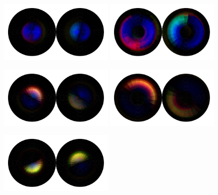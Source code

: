 \begin{figure}[h!]
    \begin{center}
        \includegraphics[width=0.49\textwidth]{figures/appendix_featurevis/TU3_0_1_0.pdf}
        \includegraphics[width=0.49\textwidth]{figures/appendix_featurevis/TU3_0_1_1.pdf}
    \end{center}
    \begin{center}
        \includegraphics[width=0.49\textwidth]{figures/appendix_featurevis/TU3_3_0_0.pdf}
        \includegraphics[width=0.49\textwidth]{figures/appendix_featurevis/TU3_3_0_1.pdf}
    \end{center}
    \begin{center}
        \includegraphics[width=0.49\textwidth]{figures/appendix_featurevis/TU3_2_2_0.pdf}

\end{center}
\end{figure}
